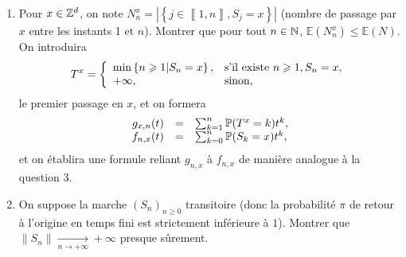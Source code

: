 \documentclass[12pt]{article}
\begin{document}
\begin{exercise}
\begin{enumerate}
        \item Pour $x\in\mathbb{Z}^{d}$, on note $N_n^{x}=\left\lvert\left\lbrace j\in\left\llbracket1,n\right\rrbracket, S_j=x\right\rbrace\right\rvert$ (nombre de passage par $x$ entre les instants 1 et $n$). Montrer que pour tout $n\in\mathbb{N}$, $\mathbb{E}(N_n^{x})\leqslant\mathbb{E}(N)$. On introduira 
        \begin{equation}
            T^{x}=
            \left\lbrace
                \begin{array}[]{ll}
                    \min\left\lbrace n\geqslant 1\middle| S_n=x\right\rbrace, &\text{s'il existe }n\geqslant1, S_n=x,\\
                    +\infty, &\text{sinon,}
                \end{array}
            \right.
        \end{equation}
        le premier passage en $x$, et on formera 
        \begin{equation}
            \begin{array}[]{rcl}
                g_{x,n}(t) &=& \sum_{k=1}^{n}\P(T^{x}=k)t^{k},\\
                f_{n,x}(t) &=& \sum_{k=0}^{n}\P(S_{k}=x)t^{k},
            \end{array}
        \end{equation}
        et on établira une formule reliant $g_{n,x}$ à $f_{n,x}$ de manière analogue à la question 3.

        \item On suppose la marche $(S_n)_{n\geqslant0}$ transitoire (donc la probabilité $\pi$ de retour à l'origine en temps fini est strictement inférieure à $1$). Montrer que $\left\lVert S_n\right\rVert\xrightarrow[n\to+\infty]{}+\infty$ presque sûrement.
    \end{enumerate}
\end{exercise}
\end{document}

